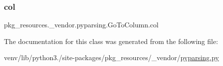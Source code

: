 \subsubsection{\texorpdfstring{col}{col}}
{\footnotesize\ttfamily pkg\+\_\+resources.\+\_\+vendor.\+pyparsing.\+Go\+To\+Column.\+col}



The documentation for this class was generated from the following file\+:\begin{DoxyCompactItemize}
\item 
venv/lib/python3./site-\/packages/pkg\+\_\+resources/\+\_\+vendor/\hyperlink{pkg__resources_2__vendor_2pyparsing_8py}{pyparsing.\+py}\end{DoxyCompactItemize}
